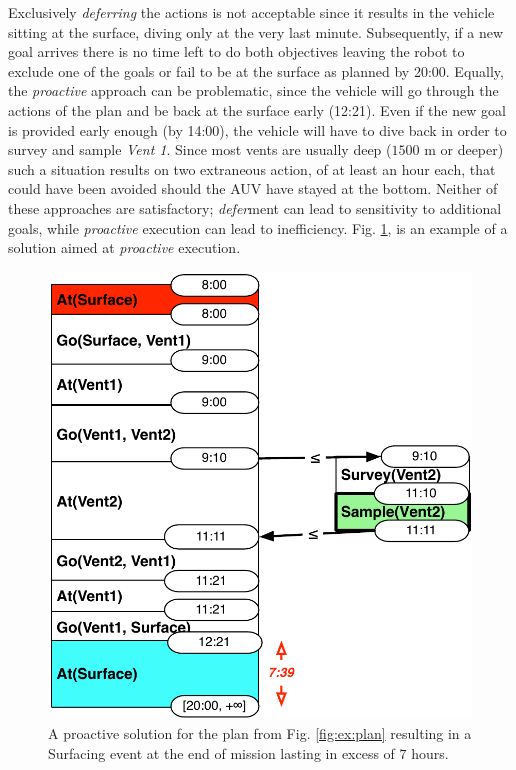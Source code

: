 Exclusively {\em deferring} the actions is not acceptable since it
results in the vehicle sitting at the surface, diving only at the very
last minute. Subsequently, if a new goal arrives there is no time left
to do both objectives leaving the robot to exclude one of the goals or
fail to be at the surface as planned by 20:00. Equally, the {\em
  proactive} approach can be problematic, since the vehicle will go
through the actions of the plan and be back at the surface early
(12:21). Even if the new goal is provided early enough (by 14:00), the
vehicle will have to dive back in order to survey and sample {\em
  Vent 1}.
Since most vents are usually deep ($1500$ m or deeper) such a
situation results on two extraneous action, of at least an hour each,
that could have been avoided should the AUV have stayed at the bottom.
Neither of these approaches are satisfactory; {\em defer}ment can lead to
sensitivity to additional goals, while \emph{proactive} execution
can lead to inefficiency.  Fig. \ref{fig:ex:proactive}, is an example of a
solution aimed at \emph{proactive} execution.



\begin{figure}
  \centering
  \includegraphics[width=0.65\columnwidth]{figs/example_early}
  \vskip-3mm
  \caption{\small A proactive solution for the plan from
    Fig. \ref{fig:ex:plan} resulting in a Surfacing event at the end
    of mission lasting in excess of $7$ hours.}
  \label{fig:ex:proactive}
\end{figure}


